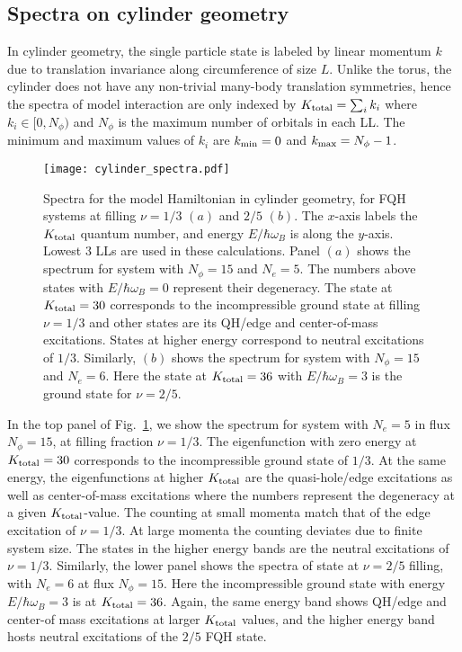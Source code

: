 \documentclass[prb,aps,epsfig,longbibliography,twocolumn]{revtex4-1}
\newcommand{\np}{N_{\phi}}
\begin{document}
\subsection{Spectra on cylinder geometry} \label{NRcylinder}
In cylinder geometry, the single particle state is labeled by linear momentum  $k$ due to translation invariance along circumference of size $L$. Unlike the torus, the cylinder does not have any non-trivial many-body translation symmetries, hence the spectra of model interaction are only indexed by $K_{\rm total}=\sum_i k_i$ where $k_i\in[0,\np)$ and $\np$ is the maximum number of orbitals in each LL. The minimum and maximum values of $k_i$ are $k_{\rm min}=0$ and $k_{\rm max}=\np-1$.

\begin{figure}[h]
	\texttt{[image: cylinder\_spectra.pdf]}
	\caption{
		Spectra for the model Hamiltonian in cylinder geometry, for FQH systems at filling $\nu=1/3$ $(a)$ and $2/5$  $(b)$. 
		The $x$-axis labels the $K_{\rm total}$ quantum number, and energy $E/\hbar\omega_B$ is along the $y$-axis. Lowest $3$ LLs are used in these calculations.
		Panel $(a)$ shows the spectrum for system with $\np=15$ and $N_e=5$. The numbers above states with $E/\hbar\omega_B=0$ represent their degeneracy. The state at $K_{\rm total}=30$ corresponds to the incompressible ground state at filling $\nu=1/3$ and other states are its QH/edge and center-of-mass excitations. States at higher energy correspond to neutral excitations of $1/3$. Similarly, $(b)$ shows the  spectrum for system with $\np=15$ and $N_e=6$. Here the state at $K_{\rm total}=36$ with $E/\hbar\omega_B=3$ is the ground state for $\nu=2/5$.
	}
	\label{CylSpectra}
\end{figure}

In the top panel of Fig.~\ref{CylSpectra}, we show the spectrum for system with $N_e=5$ in flux $\np=15$, at filling fraction $\nu=1/3$. The eigenfunction with zero energy at  $K_{\rm total}=30$ corresponds to the incompressible ground state of $1/3$. At the same energy, the eigenfunctions at higher $K_{\rm total}$ are the quasi-hole/edge excitations as well as center-of-mass excitations where the numbers represent the degeneracy at a given $K_{\rm total}$-value. The counting at small momenta match that of the edge excitation of $\nu=1/3$. At large momenta the counting deviates due to finite system size. The states in the higher energy bands are the neutral excitations of $\nu=1/3$. Similarly, the lower panel shows the spectra of state at $\nu=2/5$ filling, with $N_e=6$ at flux $\np=15$. Here the incompressible ground state with energy $E/\hbar\omega_B=3$ is at $K_{\rm total}=36$. Again, the same energy band shows QH/edge and center-of mass excitations at larger $K_{\rm total}$ values, and the higher energy band hosts neutral excitations of the $2/5$ FQH state.
\end{document}
